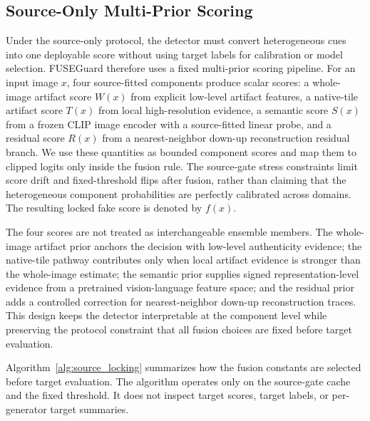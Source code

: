 \documentclass[lettersize,journal]{IEEEtran}
\begin{document}
\subsection{Source-Only Multi-Prior Scoring}
\label{sec:method_scoring}

Under the source-only protocol, the detector must convert heterogeneous cues into one deployable score without using target labels for calibration or model selection. FUSEGuard therefore uses a fixed multi-prior scoring pipeline. For an input image $x$, four source-fitted components produce scalar scores: a whole-image artifact score $W(x)$ from explicit low-level artifact features, a native-tile artifact score $T(x)$ from local high-resolution evidence, a semantic score $S(x)$ from a frozen CLIP image encoder with a source-fitted linear probe, and a residual score $R(x)$ from a nearest-neighbor down-up reconstruction residual branch. We use these quantities as bounded component scores and map them to clipped logits only inside the fusion rule. The source-gate stress constraints limit score drift and fixed-threshold flips after fusion, rather than claiming that the heterogeneous component probabilities are perfectly calibrated across domains. The resulting locked fake score is denoted by $f(x)$.

The four scores are not treated as interchangeable ensemble members. The whole-image artifact prior anchors the decision with low-level authenticity evidence; the native-tile pathway contributes only when local artifact evidence is stronger than the whole-image estimate; the semantic prior supplies signed representation-level evidence from a pretrained vision-language feature space; and the residual prior adds a controlled correction for nearest-neighbor down-up reconstruction traces. This design keeps the detector interpretable at the component level while preserving the protocol constraint that all fusion choices are fixed before target evaluation.

Algorithm~\ref{alg:source_locking} summarizes how the fusion constants are selected before target evaluation. The algorithm operates only on the source-gate cache and the fixed threshold. It does not inspect target scores, target labels, or per-generator target summaries.
\end{document}
